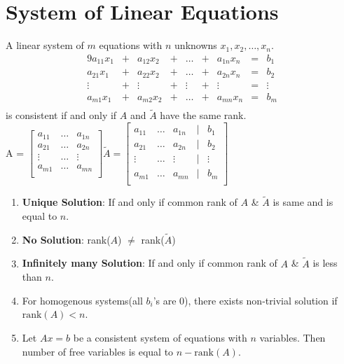 \documentclass[a4paper,oneside]{book}
\begin{document}
\section{System of Linear Equations}
A linear system of $m$ equations with $n$ unknowns $x_1, x_2, \ldots, x_n$.
\begin{alignat*}{9}
a_{11}x_1 & {}+{} &  a_{12}x_2 & {}+{} & \ldots & {}+{} & a_{1n}x_n & {}={} & b_1 \\
a_{21}x_1 & {}+{} &  a_{22}x_2 & {}+{} & \ldots & {}+{} & a_{2n}x_n & {}={} &  b_2 \\
\vdots    & {}+{} &  \vdots    & {}+{} & \vdots & {}+{} & \vdots    & {}={} &  \vdots \\
a_{m1}x_1 & {}+{} &  a_{m2}x_2 & {}+{} & \ldots & {}+{} & a_{mn}x_n & {}={} & b_m \\
\end{alignat*}
is consistent if and only if $A$ and $\tilde{A}$ have the same rank.\\
A = $\begin{bmatrix}
a_{11} & \ldots & a_{1n} \\
a_{21} & \ldots & a_{2n} \\
\vdots & \ldots & \vdots \\
a_{m1} & \ldots & a_{mn} \\
\end{bmatrix}
\tilde{A} = \begin{bmatrix}
a_{11} & \ldots & a_{1n} & {}|{} & b_1\\
a_{21} & \ldots & a_{2n} & {}|{} & b_2 \\
\vdots & \ldots & \vdots & {}|{} & \vdots \\
a_{m1} & \ldots & a_{mn} & {}|{} & b_m \\
\end{bmatrix}$
\begin{enumerate}
\item \textbf{Unique Solution}: If and only if common rank of $A$ \& $\tilde{A}$ is same and is equal to $n$.
\item \textbf{No Solution}: rank($A$) $\neq$ rank($\tilde{A}$)
\item \textbf{Infinitely many Solution}: If and only if common rank of $A$ \& $\tilde{A}$ is less than $n$.
\item For homogenous systems(all $b_i$'s are 0), there exists non-trivial solution if $\text{rank}(A) < n$.
\item Let $Ax = b$ be a consistent system of equations with $n$ variables. Then number of free variables is equal to $n - \text{rank}(A)$.
\end{enumerate}
\end{document}
